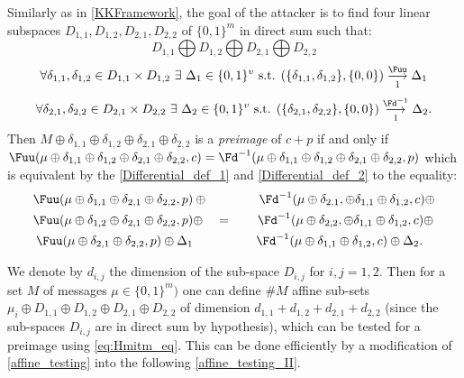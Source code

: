 Similarly as in \autoref{KKFramework}, the goal of the attacker is to find four linear subspaces
$D_{1,1}, D_{1,2}, D_{2,1}, D_{2,2}$ of $\{0,1\}^m$ in direct sum such that:
\begin{equation}
\label{eq:Dir_sum}
  D_{1,1} \bigoplus D_{1,2} \bigoplus D_{2,1} \bigoplus D_{2,2} 
\end{equation}
\vspace{-4mm}
\begin{equation}
\forall \delta_{1,1} , \delta_{1,2} \in D_{1,1} \times D_{1,2}~\exists~ \Delta_1 \in \{0,1\}^v \text{ s.t. }
(\{\delta_{1,1}, \delta_{1,2}\}, \{0,0\})
\overset{\Fuu}{\underset{1}{\longrightarrow}} \Delta_1
\label{Differential_def_1}
\end{equation}
\vspace{-4mm}
\begin{equation}
\forall \delta_{2,1} , \delta_{2,2} \in D_{2,1} \times D_{2,2}~\exists~ \Delta_2 \in \{0,1\}^v \text{ s.t. }
(\{\delta_{2,1}, \delta_{2,2}\}, \{0,0\})
\overset{\Fd^{-1}}{\underset{1}{\longrightarrow}} \Delta_2.
\label{Differential_def_2}
\end{equation}
Then $M \oplus \delta_{1,1} \oplus \delta_{1,2} \oplus \delta_{2,1} \oplus \delta_{2,2}$ 
is a \emph{preimage} of $c+p$ if and only if $
    \Fuu(\mu \oplus \delta_{1,1} \oplus \delta_{1,2} \oplus 
    \delta_{2,1} \oplus \delta_{2,2}, c) = 
    \Fd^{-1}(\mu \oplus \delta_{1,1} \oplus \delta_{1,2} \oplus 
    \delta_{2,1} \oplus \delta_{2,2}, p) $
which is equivalent by the \autoref{Differential_def_1} 
and \autoref{Differential_def_2} to the equality: 
\begin{equation}
  \label{eq:Hmitm_eq}
  \begin{split}
  \Fuu(\mu \oplus \delta_{1,1} \oplus \delta_{2,1} \oplus \delta_{2,2}, p) & 
    \oplus \quad \qquad \quad 
    \Fd^{-1}(\mu \oplus \delta_{2,1},\oplus \delta_{1,1} \oplus \delta_{1,2}, c) \oplus \\
    \Fuu(\mu \oplus \delta_{1,2} \oplus \delta_{2,1} \oplus \delta_{2,2}, p) & 
    \oplus\quad  = \quad \quad   
    \Fd^{-1}(\mu \oplus \delta_{2,2}, \oplus \delta_{1,1} \oplus \delta_{1,2}, c) \oplus \\ 
    \Fuu(\mu \oplus \delta_{2,1} \oplus \delta_{2,2}, p) \oplus \Delta_1 & 
    \qquad \quad \quad \quad   
    \Fd^{-1}(\mu \oplus \delta_{1,1}  \oplus \delta_{1,2}, c) \oplus \Delta_2.
    \end{split}
\end{equation}

We denote by $d_{i,j}$ the dimension of the 
sub-space $D_{i,j}$ for $i,j=1,2$. Then for a set $M$ of messages $\mu \in \{0,1\}^m)$ one can define $\# M$ affine sub-sets 
$\mu_i \oplus D_{1,1} \oplus D_{1,2} \oplus D_{2,1} \oplus D_{2,2}$ of dimension $d_{1,1} + d_{1,2} + d_{2,1} +d_{2,2}$
(since the sub-spaces $D_{i,j}$ are in direct sum by hypothesis), which can be tested for a preimage using \autoref{eq:Hmitm_eq}.
This can be done efficiently by a modification of \autoref{affine_testing} into the following \autoref{affine_testing_II}.

